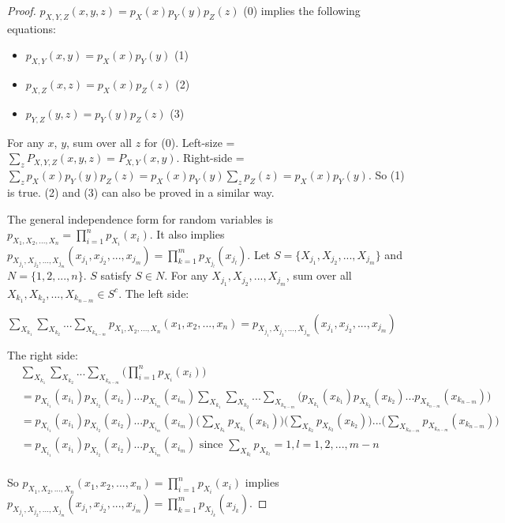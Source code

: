 \documentclass{book}
\begin{document}
\begin{proof}
$p_{X,Y,Z}(x,y,z) = p_{X}(x)p_{Y}(y)p_{Z}(z)$ (0) implies the following equations:

\begin{itemize}
  \item $p_{X,Y}(x,y) = p_{X}(x)p_{Y}(y)$  (1)
  \item $p_{X,Z}(x,z) = p_{X}(x)p_{Z}(z)$  (2)
  \item $p_{Y,Z}(y,z) = p_{Y}(y)p_{Z}(z)$  (3)
\end{itemize}

For any $x$, $y$, sum over all $z$ for (0). Left-size =
$\sum_{z}P_{X,Y,Z}(x,y,z) = P_{X,Y}(x,y)$. Right-side =
$\sum_{z}p_{X}(x)p_{Y}(y)p_{Z}(z) = p_{X}(x)p_{Y}(y)\sum_{z}p_{Z}(z) =
p_{X}(x)p_{Y}(y)$. So (1) is true. (2) and (3) can also be proved in a similar
way.

The general independence form for random variables is $p_{X_1,X_2,...,X_n} =
\prod_{i=1}^{n}p_{X_i}(x_i)$. It also implies $p_{X_{j_{1}},
X_{j_{2}},...,X_{j_{m}}}(x_{j_1},x_{j_2},...,x_{j_m}) = \prod_{k=1}^{m}p_{X_{j_{l}}}(x_{j_{l}})$. Let $S = \{
{X_{j_{1}}},{X_{j_{2}},...,X_{j_{m}}} \}$ and $N = \{1,2,...,n\}$. $S$ satisfy
$S \in N$. For any $X_{j_{1}}, X_{j_{2}},...,X_{j_{m}}$, sum over all
$X_{k_{1}}, X_{k_{2}},...,X_{k_{n-m}} \in S^c$. The left side:

$\sum_{X_{k_{1}}}\sum_{X_{k_{2}}}...\sum_{X_{k_{n-m}}}p_{X_{1},X_{2},...,X_{n}}
(x_1,x_2,...,x_n) =p_{X_{j_{1}}, X_{j_{2}},...,X_{j_{m}}}(x_{j_{1}}, x_{j_{2}},...,x_{j_{m}})$

The right side:
\begin{align*}
& \sum_{X_{k_1}}\sum_{X_{k_2}}...\sum_{X_{k_{n-m}}}\Big(\prod_{i=1}^{n}p_{X_i}(x_i)\Big) \\
&= p_{X_{i_1}}(x_{i_1})p_{X_{i_2}}(x_{i_2})...p_{X_{i_m}}(x_{i_m})\sum_{X_{k_{1}}}\sum_{X_{k_{2}}}...\sum_{X_{k_{n-m}}}
   \Big(p_{X_{k_{1}}}(x_{k_{1}})p_{X_{k_{2}}}(x_{k_{2}})...p_{X_{k_{n-m}}}(x_{k_{n-m}})\Big) \\
&= p_{X_{i_1}}(x_{i_1})p_{X_{i_2}}(x_{i_2})...p_{X_{i_m}}(x_{i_m})\Big(\sum_{X_{k_{1}}}p_{X_{k_{1}}}(x_{k_{1}})\Big)
   \Big(\sum_{X_{k_{2}}}p_{X_{k_{2}}}(x_{k_{2}})\Big)...\Big(\sum_{X_{k_{n-m}}}p_{X_{k_{n-m}}}(x_{k_{n-m}})\Big) \\
&= p_{X_{i_1}}(x_{i_1})p_{X_{i_2}}(x_{i_2})...p_{X_{i_m}}(x_{i_m}) \text{ since } \sum_{X_{k_l}} p_{X_{k_l}} = 1, l = 1,2,..., m-n \\
\end{align*}

So $p_{X_1,X_2,...,X_n}(x_1,x_2,...,x_n) = \prod_{i=1}^{n}p_{X_i}(x_i)$ implies $p_{X_{j_{1}},
X_{j_{2}},...,X_{j_{m}}}(x_{j_1},x_{j_2},...,x_{j_m}) = \prod_{k=1}^{m}p_{X_{j_{k}}}(x_{j_{k}})$.
\end{proof}
\end{document}
